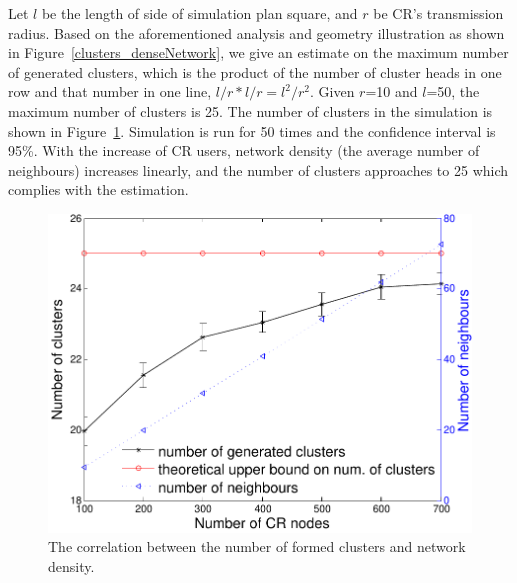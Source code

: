 \documentclass[10pt,journal,compsoc]{IEEEtran}
\theoremstyle{mytheoremstyle}
\theoremstyle{mytheoremstyle}
\theoremstyle{mytheoremstyle}
\begin{document}
Let $l$ be the length of side of simulation plan square, and $r$ be CR's transmission radius.
Based on the aforementioned analysis and geometry illustration as shown in Figure~\ref{clusters_denseNetwork}, we give an estimate on the maximum number of generated clusters, which is the product of the number of cluster heads in one row and that number in one line, $l/r * l/r = l^2/r^2$.
Given $r$=10 and $l$=50, the maximum number of clusters is 25.
The number of clusters in the simulation is shown in Figure~\ref{number_clusters_scale}.
Simulation is run for 50 times and the confidence interval is 95\%.
With the increase of CR users, network density (the average number of neighbours) increases linearly, and the number of clusters approaches to 25 which complies with the estimation.

\begin{figure}[h]
  \centering
  \includegraphics[width=0.7\linewidth]{number_clusters_upperBound.pdf}
  \caption{The correlation between the number of formed clusters and network density.}
  \label{number_clusters_scale}
\end{figure}
\end{document}
